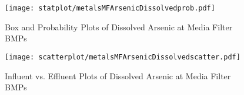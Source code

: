         \begin{figure}[hb]   %
            \centering
            \texttt{[image: statplot/metalsMFArsenicDissolvedprob.pdf]}
            \caption{Box and Probability Plots of Dissolved Arsenic at Media Filter BMPs}
        \end{figure}         %
        
        
        \begin{figure}[hb]   %
            \centering
            \texttt{[image: scatterplot/metalsMFArsenicDissolvedscatter.pdf]}
            \caption{Influent vs. Effluent Plots of Dissolved Arsenic at Media Filter BMPs}
        \end{figure}         %
        \clearpage
        